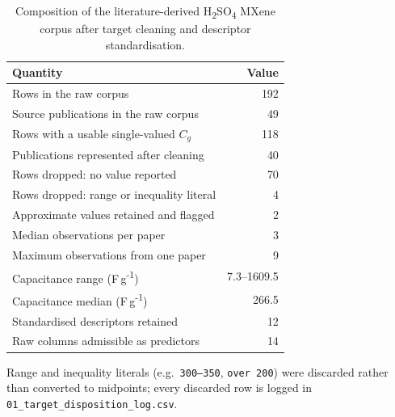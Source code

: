 \begin{table}[htbp]
\centering
\caption{Composition of the literature-derived H\textsubscript{2}SO\textsubscript{4} MXene corpus after target cleaning and descriptor standardisation.}
\label{tab:dataset}
\footnotesize
\begin{tabular}{lr}
\toprule
\textbf{Quantity} & \textbf{Value} \\
\midrule
Rows in the raw corpus & 192 \\
Source publications in the raw corpus & 49 \\
Rows with a usable single-valued $C_g$ & 118 \\
Publications represented after cleaning & 40 \\
Rows dropped: no value reported & 70 \\
Rows dropped: range or inequality literal & 4 \\
Approximate values retained and flagged & 2 \\
Median observations per paper & 3 \\
Maximum observations from one paper & 9 \\
Capacitance range (F\,g\textsuperscript{-1}) & 7.3--1609.5 \\
Capacitance median (F\,g\textsuperscript{-1}) & 266.5 \\
Standardised descriptors retained & 12 \\
Raw columns admissible as predictors & 14 \\
\bottomrule
\end{tabular}
\par\vspace{2pt}\begin{minipage}{\linewidth}\scriptsize Range and inequality literals (e.g.\ \texttt{300--350}, \texttt{over 200}) were discarded rather than converted to midpoints; every discarded row is logged in \texttt{01\_target\_disposition\_log.csv}.\end{minipage}
\end{table}